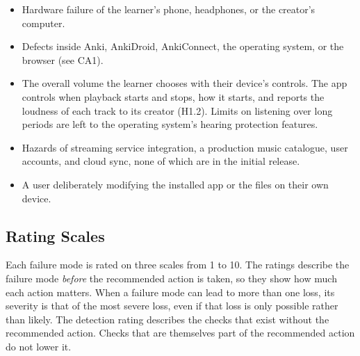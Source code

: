 \documentclass{article}
\begin{document}
\begin{itemize}
  \item Hardware failure of the learner's phone, headphones, or the creator's
        computer.
  \item Defects inside Anki, AnkiDroid, AnkiConnect, the operating system, or
        the browser (see CA1).
  \item The overall volume the learner chooses with their device's controls.
        The app controls when playback starts and stops, how it starts, and
        reports the loudness of each track to its creator (H1.2). Limits on
        listening over long periods are left to the operating system's hearing
        protection features.
  \item Hazards of streaming service integration, a production music
        catalogue, user accounts, and cloud sync, none of which are in the
        initial release.
  \item A user deliberately modifying the installed app or the files on their
        own device.
\end{itemize}

\subsection{Rating Scales}

Each failure mode is rated on three scales from 1 to 10. The ratings describe
the failure mode \emph{before} the recommended action is taken, so they show
how much each action matters. When a failure mode can lead to more than one
loss, its severity is that of the most severe loss, even if that loss is only
possible rather than likely. The detection rating describes the checks that
exist without the recommended action. Checks that are themselves part of the
recommended action do not lower it.
\end{document}
